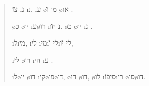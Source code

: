 \begin{verse}
	  
	\u{צו}  
	\i{נ} \i{נ}.
	\i{ע} \o{מו} \u{ו}
	 \o{או} .

	\o{כ} \o{יו} \i{ע}\o{רו}  
	\i{נ} \u{חו}.
	\o{כ} \o{יו} 
	\i{נ} .

	\i{ל}\i{מי}, \i{לי} \i{מי}\i{לי}
	\u{ו}\i{לי}  \u{יו},

	\i{לי} \o{רו} \i{הי} \i{ע} 
	 .

	\i{ל}\o{יו}  
	 \o{דו} \i{קי}\o{פו}\o{דו},
	\o{דו} \o{דו},
	\o{לו}  
	\i{סי}\u{פו}\i{רי} \o{סו}\o{דו}.
\end{verse}
